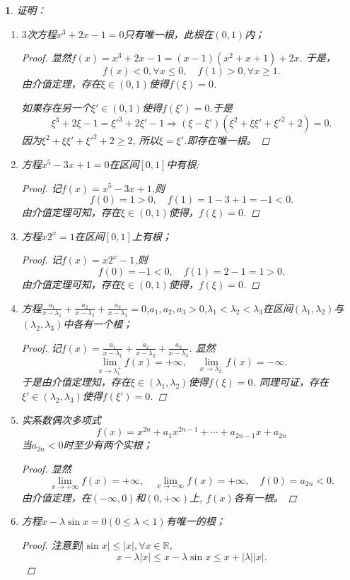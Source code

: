 \documentclass[utf8]{book}
\newtheorem{example}{}[section]             %
\begin{document}
\begin{example}
证明：
\renewcommand\labelenumi{\normalfont(\theenumi)}
\begin{enumerate}
\item $3$次方程$x^3+2x-1=0$只有唯一根，此根在$(0,1)$内；
\begin{proof}显然$f(x) = x^3+2x-1 = (x-1)(x^2+x+1)+2x$. 于是，$$f(x) < 0,\forall x \leq 0, \quad f(1) > 0, \forall x \geq 1.$$
由介值定理，存在$\xi \in (0,1)$使得$f(\xi) = 0$.

如果存在另一个$\xi'\in(0,1)$使得$f(\xi')=0$.于是
$$\xi^3+2\xi-1=\xi'^3+2\xi'-1\Rightarrow (\xi-\xi')(\xi^2+\xi\xi'+\xi'^2+2) = 0.$$
因为$\xi^2+\xi\xi'+\xi'^2+2 \geq 2$, 所以$\xi=\xi'$.即存在唯一根。
\end{proof}
\item 方程$x^5-3x+1=0$在区间$[0,1]$中有根;
\begin{proof}记$f(x) =x^5-3x+1$,则$$f(0)=1 > 0, \quad f(1) =1-3+1=-1 <0.$$由介值定理可知，存在$\xi\in(0,1)$使得，$f(\xi) = 0$.
\end{proof}
\item 方程$x2^x=1$在区间$[0,1]$上有根；
\begin{proof}
记$f(x)=x2^x-1$,则
$$f(0) = -1 < 0, \quad f(1) = 2 -1 =1 > 0.$$
由介值定理可知，存在$\xi\in(0,1)$使得，$f(\xi) = 0$.
\end{proof}
\item 方程$\displaystyle\frac{a_1}{x-\lambda_1}+\frac{a_2}{x-\lambda_2} + \frac{a_3}{x-\lambda_3} = 0$,$a_1, a_2,a_3 > 0$,$\lambda_1<\lambda_2<\lambda_3$在区间$(\lambda_1,\lambda_2)$与$(\lambda_2,\lambda_3)$中各有一个根；
\begin{proof}记$f(x)=\displaystyle\frac{a_1}{x-\lambda_1}+\frac{a_2}{x-\lambda_2} + \frac{a_3}{x-\lambda_3}$. 显然
$$\displaystyle\lim_{x\to \lambda_1^+}f(x)  = +\infty, \quad \displaystyle\lim_{x\to \lambda_2^-}f(x)  = -\infty.$$
于是由介值定理知，存在$\xi\in(\lambda_1,\lambda_2)$使得$f(\xi)= 0$.
同理可证，存在$\xi'\in(\lambda_2,\lambda_3)$使得$f(\xi')= 0$. 
\end{proof}
\item 实系数偶次多项式
$$f(x) = x^{2n}+a_1x^{2n-1}+\cdots+a_{2n-1}x+a_{2n}$$
当$a_{2n} < 0$时至少有两个实根；
\begin{proof}显然
$$\displaystyle\lim_{x\to +\infty}f(x) = +\infty, \quad \displaystyle\lim_{x\to -\infty}f(x) = +\infty, \quad f(0) = a_{2n} < 0.$$
由介值定理，在$(-\infty, 0)$和$(0,+\infty)$上,  $f(x)$各有一根。
\end{proof}
\item 方程$x-\lambda\sin{x}=0(0\leq \lambda < 1)$有唯一的根；
\begin{proof}注意到$|\sin{x}| \leq |x|,\forall x\in\mathbb{R}$, 
$$x-\lambda |x| \leq x-\lambda\sin{x} \leq x + |\lambda| |x|.$$


\end{proof}
\end{enumerate}
\end{example}
\end{document}
